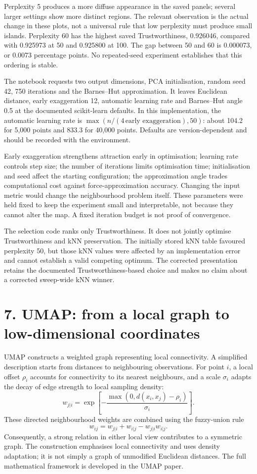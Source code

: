 \documentclass[11pt]{article}
\begin{document}
Perplexity 5 produces a more diffuse appearance in the saved panels; several larger settings show more distinct regions. The relevant observation is the actual change in these plots, not a universal rule that low perplexity must produce small islands. Perplexity 60 has the highest saved Trustworthiness, 0.926046, compared with 0.925973 at 50 and 0.925800 at 100. The gap between 50 and 60 is 0.000073, or 0.0073 percentage points. No repeated-seed experiment establishes that this ordering is stable.

The notebook requests two output dimensions, PCA initialisation, random seed 42, 750 iterations and the Barnes--Hut approximation. It leaves Euclidean distance, early exaggeration 12, automatic learning rate and Barnes--Hut angle 0.5 at the documented scikit-learn defaults. In this implementation, the automatic learning rate is $\max(n/(4\,\text{early exaggeration}),50)$: about 104.2 for 5,000 points and 833.3 for 40,000 points. Defaults are version-dependent and should be recorded with the environment.\cite{tsneapi}

Early exaggeration strengthens attraction early in optimisation; learning rate controls step size; the number of iterations limits optimisation time; initialisation and seed affect the starting configuration; the approximation angle trades computational cost against force-approximation accuracy. Changing the input metric would change the neighbourhood problem itself. These parameters were held fixed to keep the experiment small and interpretable, not because they cannot alter the map. A fixed iteration budget is not proof of convergence.

The selection code ranks only Trustworthiness. It does not jointly optimise Trustworthiness and kNN preservation. The initially stored kNN table favoured perplexity 50, but those kNN values were affected by an implementation error and cannot establish a valid competing optimum. The corrected presentation retains the documented Trustworthiness-based choice and makes no claim about a corrected sweep-wide kNN winner.

\clearpage
\section*{7. UMAP: from a local graph to low-dimensional coordinates}
UMAP constructs a weighted graph representing local connectivity. A simplified description starts from distances to neighbouring observations. For point $i$, a local offset $\rho_i$ accounts for connectivity to its nearest neighbours, and a scale $\sigma_i$ adapts the decay of edge strength to local sampling density:
\[
 w_{j|i}=\exp\!\left[-\frac{\max(0,d(x_i,x_j)-\rho_i)}{\sigma_i}\right].
\]
These directed neighbourhood weights are combined using the fuzzy-union rule
\[
 w_{ij}=w_{j|i}+w_{i|j}-w_{j|i}w_{i|j}.
\]
Consequently, a strong relation in either local view contributes to a symmetric graph. The construction emphasises local connectivity and uses density adaptation; it is not simply a graph of unmodified Euclidean distances. The full mathematical framework is developed in the UMAP paper.\cite{umap}
\end{document}

